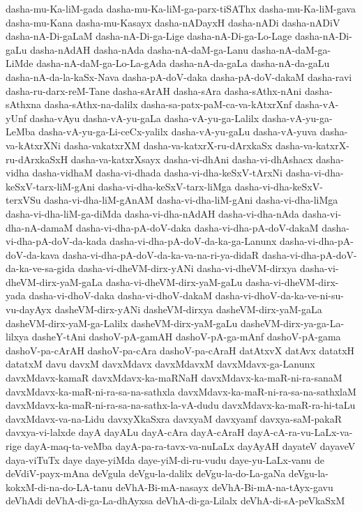 {dasha-mu-Ka-liM-gada
dasha-mu-Ka-liM-ga-parx-tiSAThx
dasha-mu-Ka-liM-gava
dasha-mu-Kana
dasha-mu-Kasayx
dasha-nADayxH
dasha-nADi
dasha-nADiV
dasha-nA-Di-gaLaM
dasha-nA-Di-ga-Lige
dasha-nA-Di-ga-Lo-Lage
dasha-nA-Di-gaLu
dasha-nAdAH
dasha-nAda
dasha-nA-daM-ga-Lanu
dasha-nA-daM-ga-LiMde
dasha-nA-daM-ga-Lo-La-gAda
dasha-nA-da-gaLa
dasha-nA-da-gaLu
dasha-nA-da-la-kaSx-Nava
dasha-pA-doV-daka
dasha-pA-doV-dakaM
dasha-ravi
dasha-ru-darx-reM-Tane
dasha-sArAH
dasha-sAra
dasha-sAthx-nAni
dasha-sAthxna
dasha-sAthx-na-dalilx
dasha-sa-patx-paM-ca-va-kAtxrXnf
dasha-vA-yUnf
dasha-vAyu
dasha-vA-yu-gaLa
dasha-vA-yu-ga-Lalilx
dasha-vA-yu-ga-LeMba
dasha-vA-yu-ga-Li-ceCx-yalilx
dasha-vA-yu-gaLu
dasha-vA-yuva
dasha-va-kAtxrXNi
dasha-vakatxrXM
dasha-va-katxrX-ru-dArxkaSx
dasha-va-katxrX-ru-dArxkaSxH
dasha-va-katxrXsayx
dasha-vi-dhAni
dasha-vi-dhAshacx
dasha-vidha
dasha-vidhaM
dasha-vi-dhada
dasha-vi-dha-keSxV-tArxNi
dasha-vi-dha-keSxV-tarx-liM-gAni
dasha-vi-dha-keSxV-tarx-liMga
dasha-vi-dha-keSxV-terxVSu
dasha-vi-dha-liM-gAnAM
dasha-vi-dha-liM-gAni
dasha-vi-dha-liMga
dasha-vi-dha-liM-ga-diMda
dasha-vi-dha-nAdAH
dasha-vi-dha-nAda
dasha-vi-dha-nA-damaM
dasha-vi-dha-pA-doV-daka
dasha-vi-dha-pA-doV-dakaM
dasha-vi-dha-pA-doV-da-kada
dasha-vi-dha-pA-doV-da-ka-ga-Lanunx
dasha-vi-dha-pA-doV-da-kava
dasha-vi-dha-pA-doV-da-ka-va-na-ri-ya-didaR
dasha-vi-dha-pA-doV-da-ka-ve-sa-gida
dasha-vi-dheVM-dirx-yANi
dasha-vi-dheVM-dirxya
dasha-vi-dheVM-dirx-yaM-gaLa
dasha-vi-dheVM-dirx-yaM-gaLu
dasha-vi-dheVM-dirx-yada
dasha-vi-dhoV-daka
dasha-vi-dhoV-dakaM
dasha-vi-dhoV-da-ka-ve-ni-su-vu-dayAyx
dasheVM-dirx-yANi
dasheVM-dirxya
dasheVM-dirx-yaM-gaLa
dasheVM-dirx-yaM-ga-Lalilx
dasheVM-dirx-yaM-gaLu
dasheVM-dirx-ya-ga-La-lilxya
dasheY-tAni
dashoV-pA-gamAH
dashoV-pA-ga-mAnf
dashoV-pA-gama
dashoV-pa-cArAH
dashoV-pa-cAra
dashoV-pa-cAraH
datAtxvX
datAvx
datatxH
datatxM
davu
davxM
davxMdavx
davxMdavxM
davxMdavx-ga-Lanunx
davxMdavx-kamaR
davxMdavx-ka-maRNaH
davxMdavx-ka-maR-ni-ra-sanaM
davxMdavx-ka-maR-ni-ra-sa-na-sathxla
davxMdavx-ka-maR-ni-ra-sa-na-sathxlaM
davxMdavx-ka-maR-ni-ra-sa-na-sathx-la-vA-dudu
davxMdavx-ka-maR-ra-hi-taLu
davxMdavx-va-na-Lidu
davxyXkaSxra
davxyaM
davxyamf
davxya-saM-pakaR
davxya-vi-lalxde
dayA
dayALu
dayA-cAra
dayA-cAraH
dayA-cA-ra-vu-LaLx-va-rige
dayA-maq-ta-veMba
dayA-pa-ra-tavx-va-nuLaLx
dayAyAH
dayateV
dayaveV
daya-viTuTx
daye
daye-yiMda
daye-yiM-di-ru-vudu
daye-yu-LaLx-vanu
de
deVdiV-payx-mAna
deVgula
deVgu-la-dalilx
deVgu-la-do-La-gaNa
deVgu-la-kokxM-di-na-do-LA-tanu
deVhA-Bi-mA-nasayx
deVhA-Bi-mA-na-tAyx-gavu
deVhAdi
deVhA-di-ga-La-dhAyxsa
deVhA-di-ga-Lilalx
deVhA-di-sA-peVkaSxM
}
